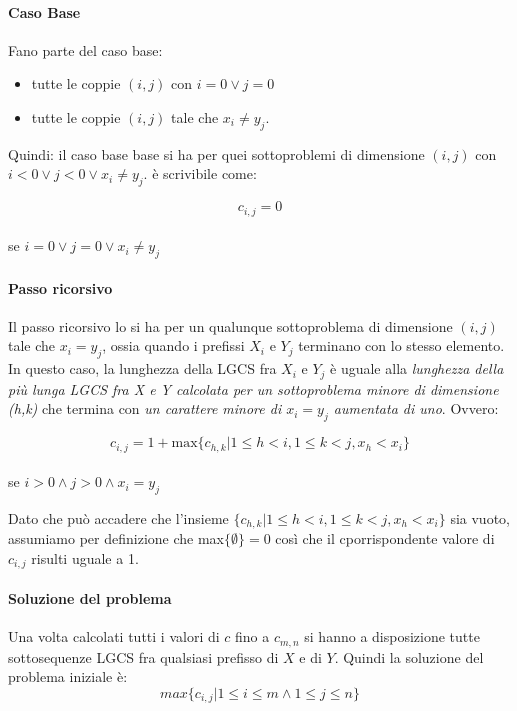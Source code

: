\documentclass[12pt, a4paper, openany]{book}
\begin{document}
\paragraph*{Caso Base}
Fano parte del caso base:
\begin{itemize}
	\item tutte le coppie $(i,j)$ con $i = 0 \vee j= 0$
	\item tutte le coppie $(i,j)$ tale che $x_i \neq y_j$.
\end{itemize}
Quindi: il caso base base si ha per quei sottoproblemi di dimensione $(i,j)$ con $i < 0 \vee j < 0 \vee x_i \neq y_j$.
è scrivibile come:
\begin{center}
	$$c_{i,j} = 0$$
	\\se $i=0 \vee j=0 \vee x_i \neq y_j$
\end{center}

\paragraph*{Passo ricorsivo}
Il passo ricorsivo lo si ha per un qualunque sottoproblema di dimensione $(i,j)$ tale che $x_i = y_j$, ossia quando i prefissi $X_i$ e $Y_j$ terminano con lo stesso elemento.
\\In questo caso, la lunghezza della LGCS fra $X_i$ e $Y_j$ è uguale alla \emph{lunghezza della più lunga LGCS fra X e Y calcolata per un sottoproblema minore di dimensione (h,k)}
che termina con \emph{un carattere minore di $x_i = y_j$ aumentata di uno}.
Ovvero:

\begin{center}
	$$c_{i,j} = 1 + \text{max}\{c_{h,k} | 1 \leq h < i, 1 \leq k < j, x_h < x_i\}$$
	\\se $i>0\wedge j>0 \wedge x_i = y_j$
\end{center}

Dato che può accadere che l'insieme $\{c_{h,k} | 1 \leq h < i, 1 \leq k < j, x_h < x_i\}$ sia vuoto, assumiamo per definizione che max$\{\emptyset\} = 0$
così che il cporrispondente valore di $c_{i,j}$ risulti uguale a 1.

\paragraph*{Soluzione del problema}
Una volta calcolati tutti i valori di $c$ fino a $c_{m,n}$ si hanno a disposizione tutte sottosequenze LGCS fra qualsiasi prefisso di $X$ e di $Y$.
Quindi la soluzione del problema iniziale è:
\begin{equation*}
	max\{c_{i,j} | 1\leq i\leq m \wedge 1 \leq j \leq n \}
\end{equation*}
\end{document}
